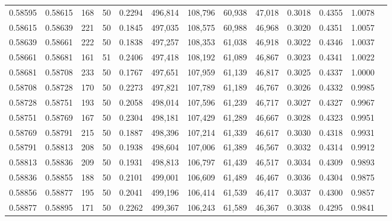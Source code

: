 \begin{tabular}{rrrrrrrrrrrrr}
0.58595 & 0.58615 &   168 &  50 &                                     0.2294 & 496,814 & 108,796 &  60,938 &  47,018 & 0.3018 & 0.4355 & 1.0078 \\
0.58615 & 0.58639 &   221 &  50 &                                     0.1845 & 497,035 & 108,575 &  60,988 &  46,968 & 0.3020 & 0.4351 & 1.0057 \\
0.58639 & 0.58661 &   222 &  50 &                                     0.1838 & 497,257 & 108,353 &  61,038 &  46,918 & 0.3022 & 0.4346 & 1.0037 \\
0.58661 & 0.58681 &   161 &  51 &                                     0.2406 & 497,418 & 108,192 &  61,089 &  46,867 & 0.3023 & 0.4341 & 1.0022 \\
0.58681 & 0.58708 &   233 &  50 &                                     0.1767 & 497,651 & 107,959 &  61,139 &  46,817 & 0.3025 & 0.4337 & 1.0000 \\
0.58708 & 0.58728 &   170 &  50 &                                     0.2273 & 497,821 & 107,789 &  61,189 &  46,767 & 0.3026 & 0.4332 & 0.9985 \\
0.58728 & 0.58751 &   193 &  50 &                                     0.2058 & 498,014 & 107,596 &  61,239 &  46,717 & 0.3027 & 0.4327 & 0.9967 \\
0.58751 & 0.58769 &   167 &  50 &                                     0.2304 & 498,181 & 107,429 &  61,289 &  46,667 & 0.3028 & 0.4323 & 0.9951 \\
0.58769 & 0.58791 &   215 &  50 &                                     0.1887 & 498,396 & 107,214 &  61,339 &  46,617 & 0.3030 & 0.4318 & 0.9931 \\
0.58791 & 0.58813 &   208 &  50 &                                     0.1938 & 498,604 & 107,006 &  61,389 &  46,567 & 0.3032 & 0.4314 & 0.9912 \\
0.58813 & 0.58836 &   209 &  50 &                                     0.1931 & 498,813 & 106,797 &  61,439 &  46,517 & 0.3034 & 0.4309 & 0.9893 \\
0.58836 & 0.58855 &   188 &  50 &                                     0.2101 & 499,001 & 106,609 &  61,489 &  46,467 & 0.3036 & 0.4304 & 0.9875 \\
0.58856 & 0.58877 &   195 &  50 &                                     0.2041 & 499,196 & 106,414 &  61,539 &  46,417 & 0.3037 & 0.4300 & 0.9857 \\
0.58877 & 0.58895 &   171 &  50 &                                     0.2262 & 499,367 & 106,243 &  61,589 &  46,367 & 0.3038 & 0.4295 & 0.9841 \\

\end{tabular}
